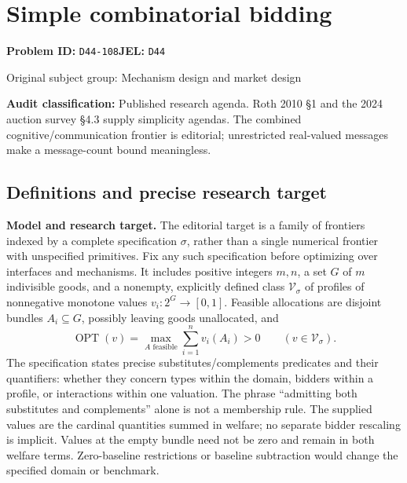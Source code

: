 \documentclass[11pt,a4paper]{article}
\begin{document}
\section*{Simple combinatorial bidding}
\textbf{Problem ID:} \texttt{D44-108}\quad \textbf{JEL:} \texttt{D44}\par
\label{problem:OP-0294}
{\sffamily\small\color{muted}Original subject group: Mechanism design and market design\par}
\label{definitions:problem:30007576}
\textbf{Audit classification:} Published research agenda. Roth 2010 §1 and the 2024 auction survey §4.3 supply simplicity agendas. The combined cognitive/communication frontier is editorial; unrestricted real-valued messages make a message-count bound meaningless.
\subsection*{Definitions and precise research target}
\textbf{Model and research target.} The editorial target is a family of frontiers indexed by a complete specification \(\sigma\), rather than a single numerical frontier with unspecified primitives. Fix any such specification before optimizing over interfaces and mechanisms. It includes positive integers \(m,n\), a set \(G\) of \(m\) indivisible goods, and a nonempty, explicitly defined class \(\mathcal V_\sigma\) of profiles of nonnegative monotone values \(v_i:2^G\to[0,1]\). Feasible allocations are disjoint bundles \(A_i\subseteq G\), possibly leaving goods unallocated, and
\[
 \operatorname{OPT}(v)=\max_{A\text{ feasible}}\sum_{i=1}^n v_i(A_i)>0
 \qquad(v\in\mathcal V_\sigma).
\]
The specification states precise substitutes/complements predicates and their quantifiers: whether they concern types within the domain, bidders within a profile, or interactions within one valuation. The phrase ``admitting both substitutes and complements'' alone is not a membership rule. The supplied values are the cardinal quantities summed in welfare; no separate bidder rescaling is implicit. Values at the empty bundle need not be zero and remain in both welfare terms. Zero-baseline restrictions or baseline subtraction would change the specified domain or benchmark.
\end{document}

